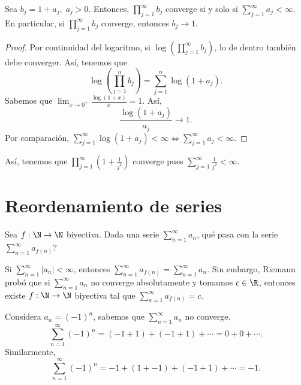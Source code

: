\begin{ftheorem}[]
	\normalfont Sea $\displaystyle b_{j} = 1 + a_{j}, \; a_{j}>0 $. Entonces, $\displaystyle \prod^{\infty}_{j=1}b_{j} $ converge si y solo si $\displaystyle \sum^{\infty}_{j=1}a_{j} < \infty $. En particular, si $\displaystyle \prod^{\infty}_{j=1}b_{j} $ converge, entonces $\displaystyle b_{j} \to 1 $.
\end{ftheorem}

\begin{proof}
Por continuidad del logaritmo, si $\displaystyle \log\left(\prod^{\infty}_{j=1}b_{j}\right) $, lo de dentro también debe converger. Así, tenemos que
\[\log\left(\prod^{n}_{j=1}b_{j}\right) = \sum^{n}_{j=1}\log\left(1+a_{j}\right) .\]
Sabemos que $\displaystyle \lim_{x \to 0^{+}}\frac{\log\left(1 + x\right)}{x} = 1 $. Así,
\[\frac{\log\left(1 + a_{j}\right)}{a_{j}}\to 1 .\]
Por comparación, $\displaystyle \sum^{\infty}_{j=1}\log\left(1+a_{j}\right) < \infty \iff \sum^{\infty}_{j=1}a_{j} < \infty $.
\end{proof}

\begin{eg}
\normalfont Así, tenemos que $\displaystyle \prod^{\infty}_{j=1}\left(1 + \frac{1}{j^{2}}\right) $ converge pues $\displaystyle \sum^{\infty}_{j=1}\frac{1}{j^{2}}<\infty $.
\end{eg}
\section{Reordenamiento de series}
Sea $\displaystyle f: \N \to \N $ biyectiva. Dada una serie $\displaystyle \sum^{\infty}_{n = 1}a_{n} $, qué pasa con la serie $\displaystyle \sum^{\infty}_{n = 1}a_{f\left(n\right)} $?
\begin{ftheorem}[]
\normalfont Si $\displaystyle \sum^{\infty}_{n = 1} \left|a_{n}\right| < \infty $, entonces $\displaystyle \sum^{\infty}_{n = 1} a_{f\left(n\right)} = \sum^{\infty}_{n = 1}a_{n} $. Sin embargo, Riemann probó que si $\displaystyle \sum^{\infty}_{n = 1}a_{n} $ no converge absolutamente y tomamos $\displaystyle c \in \R $, entonces existe $\displaystyle f : \N \to \N $ biyectiva tal que $\displaystyle \sum^{\infty}_{n = 1}a_{f\left(n\right)} = c . $ 
\end{ftheorem}

\begin{eg}
\normalfont Considera $\displaystyle a_{n} = \left(-1\right)^{n} $, sabemos que $\displaystyle \sum^{\infty}_{n = 1}a_{n} $ no converge. 
\[\sum^{\infty}_{n=1}\left(-1\right)^{n} = \left(-1+1\right) + \left(-1+1\right) + \cdots = 0 + 0 + \cdots .\]
Similarmente, 
\[\sum^{\infty}_{n = 1}\left(-1\right)^{n} = -1 + \left(1 + -1\right) + \left(-1+1\right) + \cdots = -1 .\]
\end{eg}

